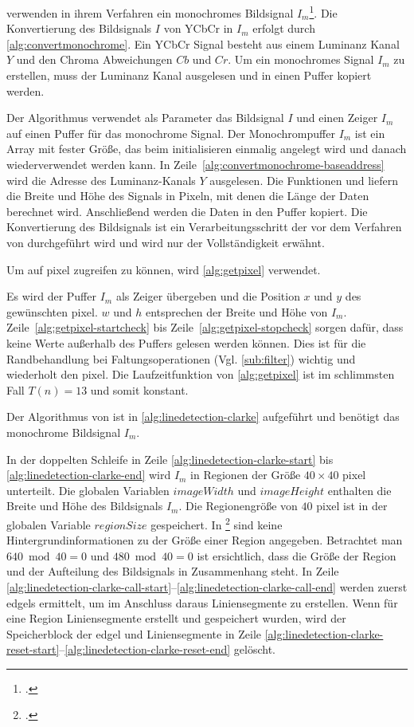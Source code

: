 \citeauthor{clarke96} verwenden in ihrem Verfahren ein monochromes Bildsignal $I_m$\footcite[Vgl.][S.~417]{clarke96}.
 Die Konvertierung des Bildsignals $I$ von YCbCr in $I_m$ erfolgt durch \autoref{alg:convertmonochrome}. Ein YCbCr
 Signal besteht aus einem Luminanz Kanal $Y$ und den Chroma Abweichungen $Cb$ und $Cr$. Um ein monochromes Signal $I_m$
 zu erstellen, muss der Luminanz Kanal ausgelesen und in einen Puffer kopiert werden.

Der Algorithmus verwendet als Parameter das Bildsignal $I$ und einen Zeiger $I_m$ auf einen Puffer für das monochrome
 Signal. Der Monochrompuffer $I_m$ ist ein Array mit fester Größe, das beim initialisieren einmalig angelegt wird und
 danach wiederverwendet werden kann. In Zeile~\ref{alg:convertmonochrome-baseaddress} wird die Adresse des
 Luminanz-Kanals $Y$ ausgelesen. Die Funktionen  und  liefern die Breite und Höhe des
 Signals in Pixeln, mit denen die Länge der Daten berechnet wird. Anschließend werden die Daten in den Puffer kopiert.
 Die Konvertierung des Bildsignals ist ein Verarbeitungsschritt der vor dem Verfahren von \citeauthor{clarke96}
 durchgeführt wird und wird nur der Vollständigkeit erwähnt.

Um auf \gls{pixel} zugreifen zu können, wird \autoref{alg:getpixel} verwendet.

Es wird der Puffer $I_m$ als Zeiger übergeben und die Position $x$ und $y$ des gewünschten \gls{pixel}. $w$ und $h$
 entsprechen der Breite und Höhe von $I_m$. Zeile~\ref{alg:getpixel-startcheck} bis Zeile~\ref{alg:getpixel-stopcheck}
 sorgen dafür, dass keine Werte außerhalb des Puffers gelesen werden können. Dies ist für die Randbehandlung bei
 Faltungsoperationen (Vgl. \autoref{sub:filter}) wichtig und wiederholt den \gls{pixel}. Die Laufzeitfunktion von
 \autoref{alg:getpixel} ist im schlimmsten Fall $T(n) = 13$ und somit konstant.

Der Algorithmus von \citeauthor{clarke96} ist in \autoref{alg:linedetection-clarke} aufgeführt und benötigt das
 monochrome Bildsignal $I_m$.

In der doppelten Schleife in Zeile \ref{alg:linedetection-clarke-start} bis \ref{alg:linedetection-clarke-end} wird
 $I_m$ in Regionen der Größe $40 \times 40$ \gls{pixel} unterteilt. Die globalen Variablen $\mathit{imageWidth}$ und
 $\mathit{imageHeight}$ enthalten die Breite und Höhe des Bildsignals $I_m$. Die Regionengröße von $40$ \gls{pixel} ist
 in der globalen Variable $\mathit{regionSize}$ gespeichert. In \citeauthor{clarke96}\footcite{clarke96} sind keine
 Hintergrundinformationen zu der Größe einer Region angegeben. Betrachtet man $640 \bmod 40 = 0$ und $480 \bmod 40 = 0$
 ist ersichtlich, dass die Größe der Region und der Aufteilung des Bildsignals in Zusammenhang steht. In Zeile
 \ref{alg:linedetection-clarke-call-start}--\ref{alg:linedetection-clarke-call-end} werden zuerst \glspl{edgel}
 ermittelt, um im Anschluss daraus Liniensegmente zu erstellen. Wenn für eine Region Liniensegmente erstellt und
 gespeichert wurden, wird der Speicherblock der \gls{edgel} und Liniensegmente in Zeile
 \ref{alg:linedetection-clarke-reset-start}--\ref{alg:linedetection-clarke-reset-end} gelöscht.

